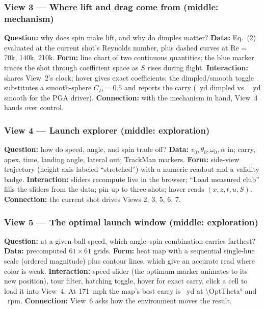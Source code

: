 \documentclass[11pt]{article}
\begin{document}
\subsubsection*{View 3 --- Where lift and drag come from (middle: mechanism)}
\textbf{Question:} why does spin make lift, and why do dimples matter? \textbf{Data:} Eq.~(2) evaluated
at the current shot's Reynolds number, plus dashed curves at Re = 70k, 140k, 210k.
\textbf{Form:} line chart of two continuous quantities; the blue marker traces the shot through
coefficient space as $S$ rises during flight. \textbf{Interaction:} shares View~2's clock; hover gives
exact coefficients; the dimpled/smooth toggle substitutes a smooth-sphere $C_D=0.5$ and reports the
carry (\RawDrvCarry{}~yd dimpled vs.\ \SmoothCarry{}~yd smooth for the PGA driver).
\textbf{Connection:} with the mechanism in hand, View~4 hands over control.

\subsubsection*{View 4 --- Launch explorer (middle: exploration)}
\textbf{Question:} how do speed, angle, and spin trade off? \textbf{Data:} $v_0,\theta_0,\omega_0,\alpha$
in; carry, apex, time, landing angle, lateral out; TrackMan markers. \textbf{Form:} side-view
trajectory (height axis labeled ``stretched'') with a numeric readout and a validity badge.
\textbf{Interaction:} sliders recompute live in the browser; ``Load measured club'' fills the sliders
from the data; pin up to three shots; hover reads $(x,z,t,u,S)$. \textbf{Connection:} the current shot
drives Views 2, 3, 5, 6, 7.

\subsubsection*{View 5 --- The optimal launch window (middle: exploration)}
\textbf{Question:} at a given ball speed, which angle--spin combination carries farthest?
\textbf{Data:} precomputed $61\times61$ grids. \textbf{Form:} heat map with a sequential single-hue
scale (ordered magnitude) plus contour lines, which give an accurate read where color is weak.
\textbf{Interaction:} speed slider (the optimum marker animates to its new position), tour filter,
hatching toggle, hover for exact carry, click a cell to load it into View~4. At \SI{171}{mph} the
map's best carry is \OptCarry{}~yd at \ang{\OptTheta} and \OptRpm{}~rpm.
\textbf{Connection:} View~6 asks how the environment moves the result.
\end{document}
